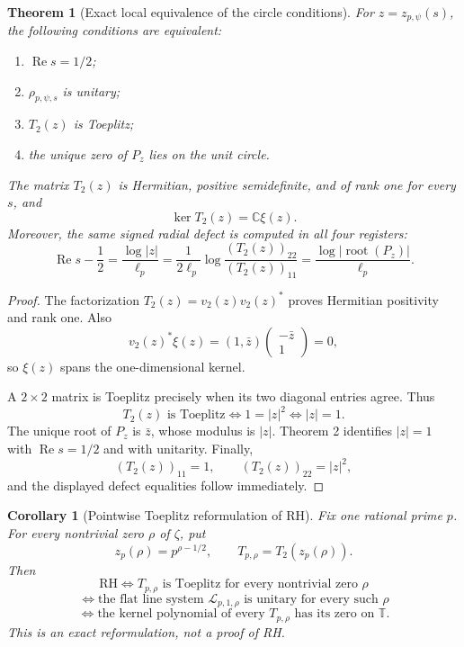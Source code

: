 \documentclass[11pt]{article}
\newtheorem{theorem}[definition]{Theorem}
\newtheorem{corollary}[definition]{Corollary}
\newcommand{\C}{\mathbb C}
\newcommand{\T}{\mathbb T}
\begin{document}
\begin{theorem}[Exact local equivalence of the circle conditions]
For $z=z_{p,\psi}(s)$, the following conditions are equivalent:
\begin{enumerate}[label=(\roman*)]
\item $\operatorname{Re}s=1/2$;
\item $\rho_{p,\psi,s}$ is unitary;
\item $T_2(z)$ is Toeplitz;
\item the unique zero of $P_z$ lies on the unit circle.
\end{enumerate}
The matrix $T_2(z)$ is Hermitian, positive semidefinite, and of rank one for every $s$, and
\[
 \ker T_2(z)=\C\xi(z).
\]
Moreover, the same signed radial defect is computed in all four registers:
\[
\boxed{
\operatorname{Re}s-\frac12
=\frac{\log|z|}{\ell_p}
=\frac{1}{2\ell_p}\log\frac{(T_2(z))_{22}}{(T_2(z))_{11}}
=\frac{\log|\operatorname{root}(P_z)|}{\ell_p}.
}
\]
\end{theorem}

\begin{proof}
The factorization $T_2(z)=v_2(z)v_2(z)^*$ proves Hermitian positivity and rank one.  Also
\[
 v_2(z)^*\xi(z)
 =(1,\bar z)\begin{pmatrix}-\bar z\\1\end{pmatrix}=0,
\]
so $\xi(z)$ spans the one-dimensional kernel.

A $2\times2$ matrix is Toeplitz precisely when its two diagonal entries agree.  Thus
\[
 T_2(z)\text{ is Toeplitz}
 \iff 1=|z|^2
 \iff |z|=1.
\]
The unique root of $P_z$ is $\bar z$, whose modulus is $|z|$.  Theorem 2 identifies $|z|=1$ with $\operatorname{Re}s=1/2$ and with unitarity.  Finally,
\[
 (T_2(z))_{11}=1,
 \qquad
 (T_2(z))_{22}=|z|^2,
\]
and the displayed defect equalities follow immediately.
\end{proof}

\begin{corollary}[Pointwise Toeplitz reformulation of RH]
Fix one rational prime $p$.  For every nontrivial zero $\rho$ of $\zeta$, put
\[
 z_p(\rho)=p^{\rho-1/2},
 \qquad
 T_{p,\rho}=T_2(z_p(\rho)).
\]
Then
\[
 \mathrm{RH}
 \iff
 \text{$T_{p,\rho}$ is Toeplitz for every nontrivial zero $\rho$}
\]
\[
 \iff
 \text{the flat line system $\mathcal L_{p,1,\rho}$ is unitary for every such $\rho$}
\]
\[
 \iff
 \text{the kernel polynomial of every $T_{p,\rho}$ has its zero on $\T$}.
\]
This is an exact reformulation, not a proof of RH.
\end{corollary}
\end{document}
